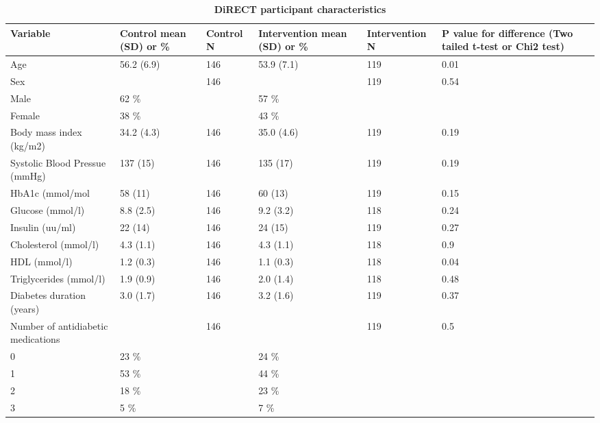 \documentclass[11pt,twoside]{bristolthesis}
\begin{document}
\begin{landscape}\begin{table}

\caption[DiRECT participant characteristics]{\label{tab:DiRECT-participants}\textbf{DiRECT participant characteristics}}
\centering
\begin{tabu} to 
\toprule
Variable & Control mean (SD) or \% & Control N & Intervention mean (SD) or \% & Intervention N & P value for difference (Two tailed t-test or Chi2 test)\\
\midrule
Age & 56.2 (6.9) & 146 & 53.9 (7.1) & 119 & 0.01\\
Sex &  & 146 &  & 119 & 0.54\\
\hspace{1em}Male & 62 \% &  & 57 \% &  & \\
\hspace{1em}Female & 38 \% &  & 43 \% &  & \\
Body mass index (kg/m2) & 34.2 (4.3) & 146 & 35.0 (4.6) & 119 & 0.19\\
\addlinespace
Systolic Blood Pressue (mmHg) & 137 (15) & 146 & 135 (17) & 119 & 0.19\\
HbA1c (mmol/mol & 58 (11) & 146 & 60 (13) & 119 & 0.15\\
Glucose (mmol/l) & 8.8 (2.5) & 146 & 9.2 (3.2) & 118 & 0.24\\
Insulin (uu/ml) & 22 (14) & 146 & 24 (15) & 119 & 0.27\\
Cholesterol (mmol/l) & 4.3 (1.1) & 146 & 4.3 (1.1) & 118 & 0.9\\
\addlinespace
HDL (mmol/l) & 1.2 (0.3) & 146 & 1.1 (0.3) & 118 & 0.04\\
Triglycerides (mmol/l) & 1.9 (0.9) & 146 & 2.0 (1.4) & 118 & 0.48\\
Diabetes duration (years) & 3.0 (1.7) & 146 & 3.2 (1.6) & 119 & 0.37\\
Number of antidiabetic medications &  & 146 &  & 119 & 0.5\\
\hspace{1em}0 & 23 \% &  & 24 \% &  & \\
\addlinespace
\hspace{1em}1 & 53 \% &  & 44 \% &  & \\
\hspace{1em}2 & 18 \% &  & 23 \% &  & \\
\hspace{1em}3 & 5 \% &  & 7 \% &  & \\

\end{tabu}
\end{table}
\end{landscape}
\end{document}
